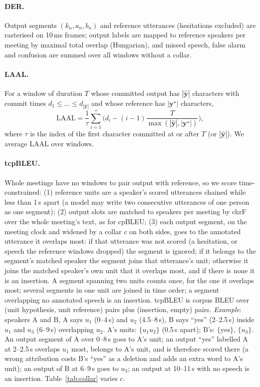 \paragraph{DER.} Output segments $(k_n,a_n,b_n)$ and reference utterances (hesitations excluded) are rasterised on
10\,ms frames; output labels are mapped to reference speakers per meeting by maximal total overlap (Hungarian), and
missed speech, false alarm and confusion are summed over all windows without a collar.

\paragraph{LAAL.} For a window of duration $T$ whose committed output has $|\hat{\bm{y}}|$ characters with commit times
$d_1\le\dots\le d_{|\hat{\bm{y}}|}$ and whose reference has $|\bm{y}^\star|$ characters,
\begin{equation}
\mathrm{LAAL}=\frac{1}{\tau}\sum_{i=1}^{\tau}\Big(d_i-(i-1)\frac{T}{\max(|\hat{\bm{y}}|,|\bm{y}^\star|)}\Big),
\end{equation}
where $\tau$ is the index of the first character committed at or after $T$ (or $|\hat{\bm{y}}|$). We average LAAL
over windows.

\paragraph{tcpBLEU.} Whole meetings have no windows to pair output with reference, so we score time-constrained:
(1) reference units are a speaker's scored utterances chained while less than 1\,s apart (a model may write two
consecutive utterances of one person as one segment); (2) output slots are matched to speakers per meeting by chrF over
the whole meeting's text, as for cpBLEU; (3) each output segment, on the meeting clock and widened by a collar $c$ on both
sides, goes to the annotated utterance it overlaps most: if that utterance was not scored (a hesitation, or speech the
reference windows dropped) the segment is ignored; if it belongs to the segment's matched speaker the segment joins that
utterance's unit; otherwise it joins the matched speaker's own unit that it overlaps most, and if there is none it is an
insertion. A segment spanning two units counts once, for the one it overlaps most; several segments in one unit are
joined in time order; a segment overlapping no annotated speech is an insertion. tcpBLEU is corpus BLEU over
(unit hypothesis, unit reference) pairs plus (insertion, empty) pairs. \emph{Example}: speakers A and B, A says $u_1$
(0--4\,s) and $u_2$ (4.5--8\,s), B says ``yes'' (2--2.5\,s) inside $u_1$ and $u_3$ (6--9\,s) overlapping $u_2$. A's units:
$\{u_1u_2\}$ (0.5\,s apart); B's: $\{\text{yes}\}$, $\{u_3\}$. An output segment of A over 0--8\,s goes to A's unit; an
output ``yes'' labelled A at 2--2.5\,s overlaps $u_1$ most, belongs to A's unit, and is therefore scored there (a wrong
attribution costs B's ``yes'' as a deletion and adds an extra word to A's unit); an output of B at 6--9\,s goes to
$u_3$; an output at 10--11\,s with no speech is an insertion. Table~\ref{tab:collar} varies $c$.

